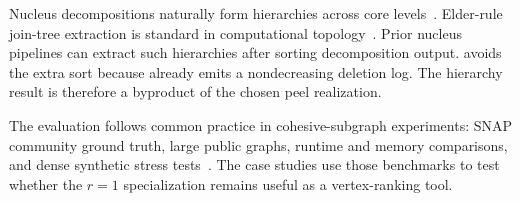 Nucleus decompositions naturally form hierarchies across core levels~\cite{nucleusSariyuce14}.
%
Elder-rule join-tree extraction is standard in computational topology~\cite{morozov2007persistence}.
%
Prior nucleus pipelines can extract such hierarchies after sorting decomposition output.
%
\buildHier{} avoids the extra sort because \peelH{} already emits a nondecreasing deletion log.
%
The hierarchy result is therefore a byproduct of the chosen peel realization.

The evaluation follows common practice in cohesive-subgraph experiments: SNAP community ground truth, large public graphs, runtime and memory comparisons, and dense synthetic stress tests~\cite{communityFinder,NuclearCD,nucleusSariyuceTODS}.
%
The case studies use those benchmarks to test whether the \(r=1\) specialization remains useful as a vertex-ranking tool.
